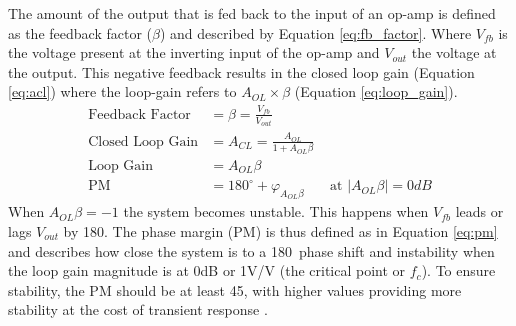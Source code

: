 The amount of the output that is fed back to the input of an op-amp is defined as the feedback factor ($\beta$) and described by Equation \ref{eq:fb_factor}. Where $V_{fb}$ is the voltage present at the inverting input of the op-amp and $V_{out}$ the voltage at the output. This negative feedback results in the closed loop gain (Equation \ref{eq:acl}) where the loop-gain refers to $A_{OL}\times\beta$ (Equation \ref{eq:loop_gain}).
\begin{align}
    \text{Feedback Factor} &= \beta = \frac{V_{fb}}{V_{out}}  \label{eq:fb_factor}\\
    \text{Closed Loop Gain} &= A_{CL} = \frac{A_{OL}}{1 + A_{OL}\beta} \label{eq:acl}\\
    \text{Loop Gain} &= A_{OL}\beta \label{eq:loop_gain}\\
    \text{PM} &= 180^\circ + \varphi_{A_{OL}\beta} &\text{ at } |A_{OL}\beta| = 0dB \label{eq:pm} 
\end{align}
When $A_{OL}\beta = -1$ the system becomes unstable. This happens when $V_{fb}$ leads or lags $V_{out}$ by 180\textdegree. The phase margin (PM) is thus defined as in Equation \ref{eq:pm} and describes how close the system is to a 180\textdegree\ phase shift and instability when the loop gain magnitude is at 0dB or 1V/V (the critical point or $f_c$). To ensure stability, the PM should be at least 45\textdegree, with higher values providing more stability at the cost of transient response \cite{StabilizeYourTransimpedance}. 
